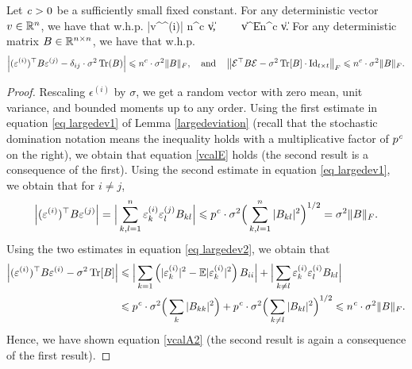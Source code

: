 \begin{corollary}\label{cor_calE}
Let ${\mathit{c}}>0$ be a sufficiently small fixed constant.
For any deterministic vector $v\in \mathbb{R}^n$, we have that w.h.p.
\be\label{vcalE}
	|v^\top \epsilon^{(i)}| \le n^{c} \cdot \sigma \|v\|, \ \ \ \ \|v^\top \cal E\| \le n^{c} \cdot \sigma  \|v\|.
\ee
For any deterministic matrix $B \in \mathbb{R}^{n\times n}$, we have that w.h.p.
\begin{align}\label{vcalA2}
	\left|(\varepsilon^{(i)})^\top B \varepsilon^{(j)} - \delta_{ij}\cdot \sigma^2 \operatorname{Tr}(B)\right| \leqslant n^{c}\cdot \sigma^2 \|B\|_F,  \ \ \text{ and }\ \
	\left\| \mathcal E^\top B \mathcal E - \sigma^2 \operatorname{Tr}[B]\cdot \operatorname{Id}_{t\times t}\right\|_F \leqslant n^{c} \cdot  \sigma^2\|B\|_F.
\end{align}
\end{corollary}
\begin{proof}
Rescaling $\epsilon^{(i)}$ by $\sigma$, we get a random vector with zero mean, unit variance, and bounded moments up to any order.
Using the first estimate in equation \eqref{eq largedev1} of Lemma \ref{largedeviation} (recall that the stochastic domination notation means the inequality holds with a multiplicative factor of $p^{{\mathit{c}}}$ on the right), we obtain that equation \eqref{vcalE} holds (the second result is a consequence of the first).
Using the second estimate in equation \eqref{eq largedev1}, we obtain that for $i\ne j$,
 \begin{align*}
\left|(\varepsilon^{(i)})^\top B \varepsilon^{(j)}\right| = \Big|\sum_{k,l=1}^n \varepsilon^{(i)}_k\varepsilon^{(j)}_l B_{kl} \Big| \leqslant p^{{\mathit{c}}} \cdot \sigma^2 \Big(\sum_{k,l=1}^n|B_{kl}|^2\Big)^{1/2}=\sigma^2 \|B\|_F.
 \end{align*}
Using the two estimates in equation \eqref{eq largedev2}, we obtain that 
\begin{align*}
\left|(\varepsilon^{(i)})^\top B \varepsilon^{(i)} - \sigma^2 \operatorname{Tr}[B]\right| &\leqslant \Big| \sum_{k=1} \left(|\varepsilon^{(i)}_k|^2-\mathbb{E}|\varepsilon^{(i)}_k|^2\right)B_{ii} \Big|+\Big| \sum_{ k\ne l } \varepsilon^{(i)}_k \varepsilon^{(i)}_l B_{kl} \Big| \\
&\leqslant p^{{\mathit{c}}}\cdot \sigma^2 \Big( \sum_{k}|B_{kk}|^2\Big)+ p^{{\mathit{c}}}\cdot \sigma^2 \Big( \sum_{k\ne l}|B_{kl}|^2\Big)^{1/2}\leqslant n^{{\mathit{c}}}\cdot\sigma^2 \|B\|_F.
\end{align*}
Hence, we have shown equation \eqref{vcalA2} (the second result is again a consequence of the first result).
\end{proof}
